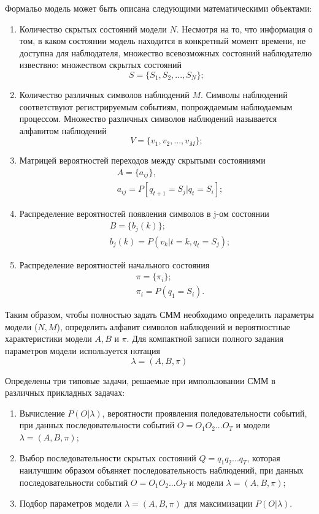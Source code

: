 Формальо модель может быть описана следующими математическими объектами:
\begin{enumerate}
	\item
	Количество скрытых состояний модели \(N\). Несмотря на то, что информация о том, в каком состоянии модель находится в конкретный момент времени, не доступна для наблюдателя, множество всевозможных состояний наблюдателю извествно:
	множеством скрытых состояний
	\[ S = \{ S_1, S_2, ..., S_N \};\]
	\item
	Количество различных символов наблюдений \(M\). Символы наблюдений соответствуют регистрируемым событиям, попрождаемым наблюдаемым процессом. Множество различных символов наблюдений называется алфавитом наблюдений
	\[ V = \{ v_1, v_2, ..., v_M \};\]
	\item
	Матрицей вероятностей переходов между скрытыми состояниями
	\begin{align} 
		&A = \{ a_{ij} \}, \nonumber \\
		&a_{ij} = P[q_{t + 1} = S_j | q_t = S_i]; \nonumber
	\end{align}
	\item
	Распределение вероятностей появления символов в j-ом состоянии
	\begin{align}
		&B = \{ b_j(k) \}; \nonumber \\ 
		&b_j(k) = P(v_k | t = k, q_t = S_j); \nonumber
	\end{align}
	\item
	Распределение вероятностей начального состояния
	\begin{align}
		&\pi = \{\pi_i\}; \nonumber \\
		&\pi_i = P(q_1 = S_i). \nonumber
	\end{align}
\end{enumerate}

Таким образом, чтобы полностью задать СММ необходимо определить параметры модели (\(N, M\)), определить алфавит символов наблюдений и вероятностные характеристики модели \(A, B\) и \(\pi\). Для компактной записи полного задания параметров модели используется нотация
\[\lambda = (A, B, \pi)\]

Определены три типовые задачи, решаемые при импользовании СММ в различных прикладных задачах\cite{Rabiner89atutorial}:
\begin{enumerate}
	\item
	Вычисление \(P(O|\lambda)\), вероятности проявления поледовательности событий, при данных последовательности событий \(O=O_1O_2...O_T\) и модели \(\lambda = (A, B, \pi)\);
	\item
	Выбор последовательности скрытых состояний \(Q=q_1q_2...q_T\), которая наилучшим образом объяняет последовательность наблюдений, при данных последовательности событий \(O=O_1O_2...O_T\) и модели \(\lambda = (A, B, \pi)\);
	\item
	Подбор параметров модели \(\lambda = (A, B, \pi)\) для максимизации \(P(O|\lambda)\).
\end{enumerate} 

